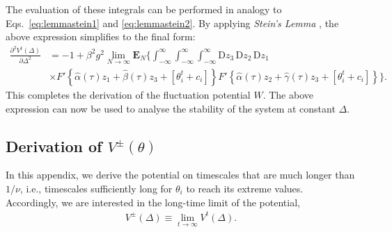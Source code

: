 \documentclass[reprint,amsmath,amssymb,aps]{revtex4-2}
\begin{document}
The evaluation of these integrals can be performed in analogy to Eqs.~\eqref{eq:lemmastein1} and \eqref{eq:lemmastein2}. By applying \textit{Stein's Lemma} \cite{ChenGoldsteinShao2011}, the above expression simplifies to the final form:
\begin{align*}
    \frac{\partial^2 V^t(\Delta)}{\partial \Delta^2}
    &=
    -1 + \beta^2g^2
    \lim_{N\to\infty} \mathbf{E}_{N} \Bigg\{\int_{-\infty}^\infty \int_{-\infty}^\infty \int_{-\infty}^\infty \mathrm{D}z_3 \, \mathrm{D}z_2 \, \mathrm{D}z_1 \, 
    \\
    &\times
    F'\left\{\hat{\alpha}(\tau) z_1 + \hat{\beta}(\tau) z_3 + \left[\theta_i^t + c_i\right]\right\}
    F'\left\{\hat{\alpha}(\tau) z_2 + \hat{\gamma}(\tau) z_3 + \left[\theta_i^{t} + c_i\right]\right\}
    \Bigg\}.
\end{align*}
This completes the derivation of the fluctuation potential $W$.  
The above expression can now be used to analyse the stability of the system at constant $\Delta$.


\subsection{Derivation of $V^\pm(\theta)$}
\label{app:proofPotentialPm}

In this appendix, we derive the potential on timescales that are much longer than $1/\nu$, i.e., timescales sufficiently long for $\theta_i$ to reach its extreme values. Accordingly, we are interested in the long-time limit of the potential,
\begin{align*}
V^\pm(\Delta)\equiv\lim_{t\to\infty}V^t(\Delta).
\end{align*}
\end{document}

